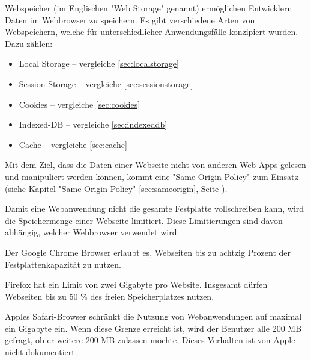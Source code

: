 \label{sec:webstorage}


Webspeicher (im Englischen "Web Storage" genannt) ermöglichen Entwicklern Daten im Webbrowser zu speichern.
Es gibt verschiedene Arten von Webspeichern, welche für unterschiedlicher Anwendungsfälle konzipiert wurden. Dazu zählen:

\begin{itemize}
    \item Local Storage -- vergleiche \ref{sec:localstorage}
    \item Session Storage -- vergleiche \ref{sec:sessionstorage}
    \item Cookies -- vergleiche \ref{sec:cookies}
    \item Indexed-DB -- vergleiche \ref{sec:indexeddb}
    \item Cache -- vergleiche \ref{sec:cache}
\end{itemize}

Mit dem Ziel, dass die Daten einer Webseite nicht von anderen Web-Apps gelesen und manipuliert werden können, kommt eine  "Same-Origin-Policy" zum Einsatz (siehe Kapitel "Same-Origin-Policy" \ref{sec:sameorigin}, Seite \pageref{sec:sameorigin}).


Damit eine Webanwendung nicht die gesamte Festplatte vollschreiben kann, wird die Speichermenge einer Webseite limitiert. 
Diese Limitierungen sind davon abhängig, welcher Webbrowser verwendet wird. \cite{WebDevStorage}

Der Google Chrome Browser erlaubt es, Webseiten bis zu achtzig Prozent der Fest\-platten\-kapazität zu nutzen. 

Firefox hat ein Limit von zwei Gigabyte pro Website. Insgesamt dürfen Webseiten bis zu 50 \% des freien Speicherplatzes nutzen. 

Apples Safari-Browser schränkt die Nutzung von Webanwendungen auf maximal ein Gigabyte ein. 
Wenn diese Grenze erreicht ist, wird der Benutzer alle 200 MB gefragt, ob er weitere 200 MB zulassen möchte. 
Dieses Verhalten ist von Apple nicht dokumentiert. 

